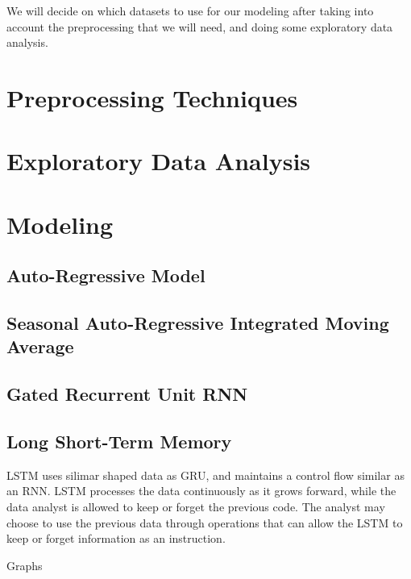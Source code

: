 \documentclass{article}
\begin{document}
	We will decide on which datasets to use for our modeling after taking into account the preprocessing that we will need, and 
	doing some exploratory data analysis. 

	\section{Preprocessing Techniques}
	\section{Exploratory Data Analysis}
	\section{Modeling}
	\subsection{Auto-Regressive Model}
	\subsection{Seasonal Auto-Regressive Integrated Moving Average}
	\subsection{Gated Recurrent Unit RNN}
	\subsection{Long Short-Term Memory}
	
	LSTM uses silimar shaped data as GRU, and maintains a control flow similar as an RNN. LSTM processes the data continuously as it grows 
	forward, while the data analyst is allowed to keep or forget the previous code. The analyst may choose to use the previous data through
	operations that can allow the LSTM to keep or forget information as an instruction.

	Graphs
	
\end{document}
